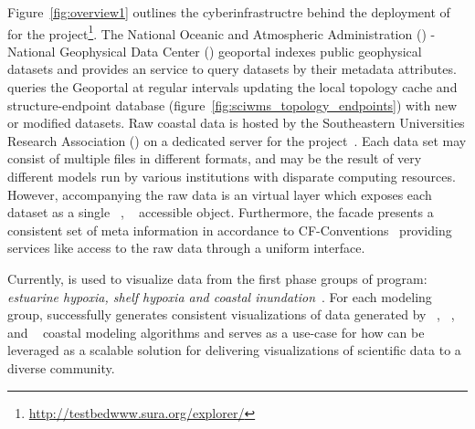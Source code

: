 Figure~\ref{fig:overview1} outlines the cyberinfrastructre behind the
deployment of \sciwms{} for the \comt{}
project\footnote{\url{http://testbedwww.sura.org/explorer/}}. The
National Oceanic and Atmospheric Administration (\noaa{}) - National
Geophysical Data Center (\ngdc{}) geoportal indexes public geophysical
datasets and provides an \ogc{} \csw{} service to query datasets by
their metadata attributes. \sciwms{} queries the \ngdc{} Geoportal at
regular intervals updating the local topology cache and
structure-endpoint database
(figure~\ref{fig:sciwms_topology_endpoints}) with new or modified
datasets. Raw coastal data is hosted by the Southeastern Universities
Research Association (\sura{}) on a dedicated server for the \comt{}
project~\cite{luettich12}. Each data set may consist of multiple files
in different formats, and may be the result of very different models
run by various institutions with disparate computing
resources. However, accompanying the raw data is an \ncml{} virtual
layer which exposes each dataset as a single \netcdf{}~\cite{netcdf},
\opendap{}~\cite{Cornillon03} accessible object. Furthermore, the
\ncml{} facade presents a consistent set of meta information in
accordance to CF-Conventions~\cite{cf} providing services like
\sciwms{} access to the raw data through a uniform interface.

Currently, \Sciwms{} is used to visualize data from the first phase
groups of \ioos{} \comt{} program: {\em estuarine hypoxia, shelf
  hypoxia and coastal inundation}~\cite{luettich13}. For each modeling
group, \sciwms{} successfully generates consistent visualizations of
data generated by \adcirc{}~\cite{adcirc}, \fvcom{}~\cite{chen06},
\selfe{}~\cite{zhang08} and \slosh{}~\cite{chen84} coastal modeling
algorithms and serves as a use-case for how \sciwms{} can be leveraged
as a scalable solution for delivering visualizations of
scientific data to a diverse community.

